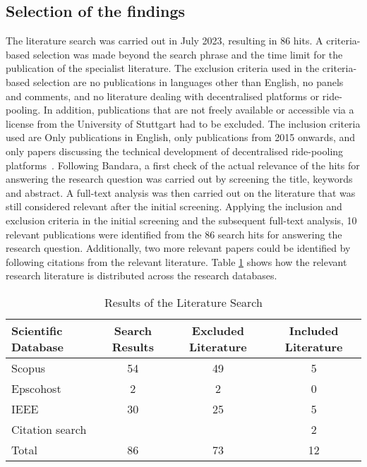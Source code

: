 \subsection{Selection of the findings}
The literature search was carried out in July 2023, resulting in 86 hits. A criteria-based selection was made beyond the search phrase and the time limit for the publication of the specialist literature. The exclusion criteria used in the criteria-based selection are no publications in languages other than English, no panels and comments, and no literature dealing with decentralised platforms or ride-pooling. In addition, publications that are not freely available or accessible via a license from the University of Stuttgart had to be excluded. The inclusion criteria used are Only publications in English, only publications from 2015 onwards, and only papers discussing the technical development of decentralised ride-pooling platforms~\cite{Bandara.2015}.
Following Bandara, a first check of the actual relevance of the hits for answering the research question was carried out by screening the title, keywords and abstract. A full-text analysis was then carried out on the literature that was still considered relevant after the initial screening. Applying the inclusion and exclusion criteria in the initial screening and the subsequent full-text analysis, 10 relevant publications were identified from the 86 search hits for answering the research question. Additionally, two more relevant papers could be identified by following citations from the relevant literature.  Table \ref{tab:litSearchResults} shows how the relevant research literature is distributed across the research databases. 


\begin{table}[h]
\centering
\caption{Results of the Literature Search}
\label{tab:litSearchResults}
\begin{tabular}{|l|c|c|c|}
\hline
Scientific Database & Search Results & Excluded Literature & Included Literature \\ \hline
Scopus & 54 & 49 & 5 \\ \hline
Epscohost & 2 & 2 & 0 \\ \hline
IEEE & 30 & 25 & 5 \\ \hline
Citation search &  &  & 2 \\ \hline \hline
Total & 86 & 73 & 12 \\ \hline
\end{tabular}
\end{table}

